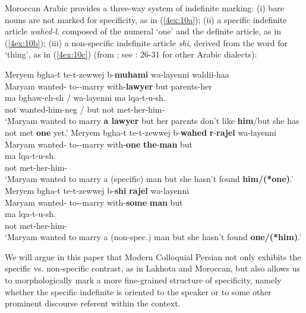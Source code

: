 \documentclass[output=paper]{langsci/langscibook}
\begin{document}
Moroccan Arabic provides a three-way system of indefinite marking: (i) bare nouns are not marked for specificity, as in (\ref{4ex:10a}); (ii) a specific indefinite article {\emph{wahed-l}}, composed of the numeral `one' and the definite article, as in (\ref{4ex:10b}); (iii) a non-specific indefinite article {\emph{shi}}, derived from the word for `thing', as in (\ref{4ex:10c}) (from \citealt{fassifehri:06}; see \citealt{brustad:00}: 26-31 for other Arabic dialects):

\begin{exe}
\ex\label{4ex:10}
	\begin{xlista}
	\ex\label{4ex:10a}
	\gll	Meryem  	bgha-t     		te-t-zewwej		b-{\bf{muhami}}		wa-layenni 	waldii-haa   \\
		Maryam 	wanted-{}  	to-{}-marry		with-{\bf{lawyer}}	but         		parents-her  \\
	\glt
	\exi{}
 	\gll	ma bghaw-eh-sh          /  	wa-layenni  	ma  	lqa-t-u-sh.  \\
      		not wanted-him-neg    /	but        		not 	met-her-him-{} \\
	\glt	`Maryam wanted to marry {\bf{a lawyer}} but her parents don't like {\bf{him}}/but she has not met {\bf{one}} yet.'
	\ex\label{4ex:10b}
	\gll	Meryem  bgha-t       te-t-zewwej b-{\bf{wahed}} {\bf{r}}-{\bf{rajel}}    	wa-layenni  \\
      		Maryam wanted-{}   to-{}-marry   with-{\bf{one}} {\bf{the}}-{\bf{man}} 	but  \\
	\glt
	\exi{}
	\gll	ma  	lqa-t-u-sh. \\
		not 	met-her-him-{} \\
	\glt	`Maryam wanted to marry a (specific) man but she hasn't found {\bf{him/(*one)}}.'
	\ex\label{4ex:10c}
	\gll	Meryem	bgha-t		te-t-zewwej		b-{\bf{shi}}           	{\bf{rajel}}   wa-layenni   \\
      		Maryam	wanted-{}	to-{}-marry  	with-{\bf{some}}  	{\bf{man}}    but  \\
	\glt
	\exi{}
	\gll	ma lqa-t-u-sh. \\
		not  met-her-him-{} \\
	\glt	`Maryam wanted to marry a (non-spec.) man but she hasn't found {\bf{one/(*him)}}.'
	\end{xlista}
\end{exe}

\newpage
We will argue in this paper that Modern Colloquial Persian not only exhibits the specific vs. non-specific contrast, as in Lakhota and Moroccan, but also allows us to morphologically mark a more fine-grained structure of specificity, namely whether the specific indefinite is oriented to the speaker or to some other prominent discourse referent within the context.
\end{document}
